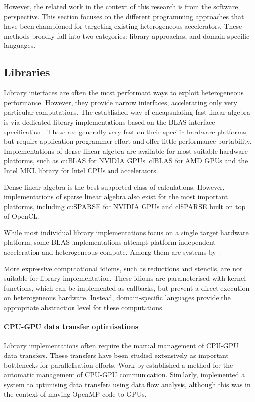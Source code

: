     However, the related work in the context of this research is from
    the software perspective.
    This section focuses on the different programming approaches that
    have been championed for targeting existing heterogeneous accelerators.
    These methods broadly fall into two categories: library approaches, and
    domain-specific languages.

\subsection{Libraries}

    Library interfaces are often the most performant ways to exploit
    heterogeneous performance.
    However, they provide narrow interfaces, accelerating only very particular
    computations.
    The established way of encapsulating fast linear algebra is via dedicated
    library implementations based on the BLAS interface specification
    \cite{2002:USB:567806.567807}.
    These are generally very fast on their specific hardware platforms, but
    require application programmer effort and offer little performance portability.
    Implementations of dense linear algebra are available for most suitable
    hardware platforms, such as cuBLAS \cite{cublas} for NVIDIA GPUs, clBLAS
    \cite{clblas} for AMD GPUs and the Intel MKL library \cite{mkl} for Intel
    CPUs and accelerators.

    Dense linear algebra is the best-supported class of calculations.
    However, implementations of sparse linear algebra also exist for
    the most important platforms, including cuSPARSE \cite{cusparse} for NVIDIA
    GPUs and clSPARSE \cite{clsparse} built on top of OpenCL.

    While most individual library implementations focus on a single target
    hardware platform, some BLAS implementations attempt platform independent
    acceleration and heterogeneous compute.
    Among them are systems by \citet{Wang:2016:BHP:2925426.2926256,
    10.1007/978-3-319-64203-1_33, Diego2017Multi}.

    More expressive computational idioms, such as reductions and stencils, are
    not suitable for library implementation.
    These idioms are parameterised with kernel functions, which can be
    implemented as callbacks, but prevent a direct execution on heterogeneous
    hardware.
    Instead, domain-specific languages provide the appropriate abstraction
    level for these computations.

    \paragraph*{CPU-GPU data transfer optimisations}
    Library implementations often require the manual management of CPU-GPU
    data transfers.
    These transfers have been studied extensively as important bottlenecks for
    parallelisation efforts.
    Work by \citet{Jablin:2011:ACC:1993316.1993516} established a
    method for the automatic management of CPU-GPU communication.
    Similarly, \citet{Lee:2009:OGC:1594835.1504194} implemented a system to
    optimising data transfers using data flow analysis, although this was in
    the context of maving OpenMP code to GPUs.

